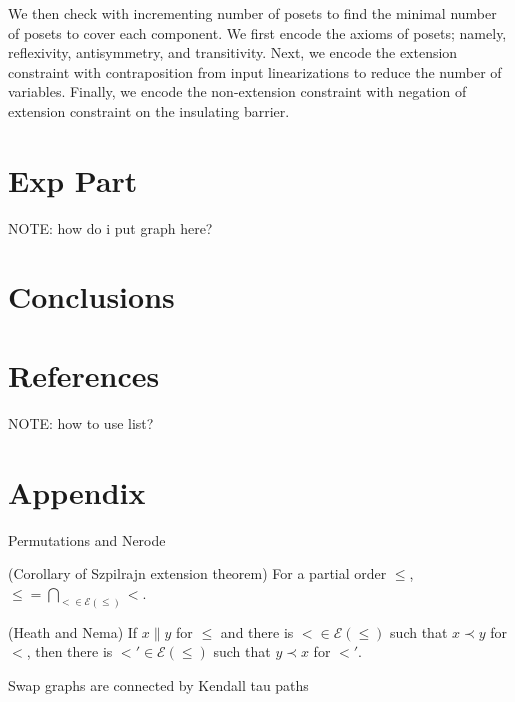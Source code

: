 \documentclass{llncs}
\begin{document}
We then check with incrementing number of posets to find the minimal number of posets to cover each component. We first encode the axioms of posets; namely, reflexivity, antisymmetry, and transitivity. Next, we encode the extension constraint with contraposition from input linearizations to reduce the number of variables. Finally, we encode the non-extension constraint with negation of extension constraint on the insulating barrier.

\section{Exp Part}
NOTE: how do i put graph here?

\section{Conclusions}

\section{References}
NOTE: how to use list?

\section{Appendix}

\begin{theorem}
    Permutations and Nerode
\end{theorem}

\begin{theorem}
    (Corollary of Szpilrajn extension theorem) For a partial order $\leq$, $\leq = \bigcap_{< \in \mathcal{E}(\leq)} <$.
\end{theorem}

\begin{theorem}
    (Heath and Nema) If $x \parallel y$ for $\leq$ and there is $< \in \mathcal{E}(\leq)$ such that $x \prec y$ for $<$, then there is $<' \in \mathcal{E}(\leq)$ such that $y \prec x$ for $<'$.
\end{theorem}

\begin{theorem}
    Swap graphs are connected by Kendall tau paths
\end{theorem}
\end{document}
